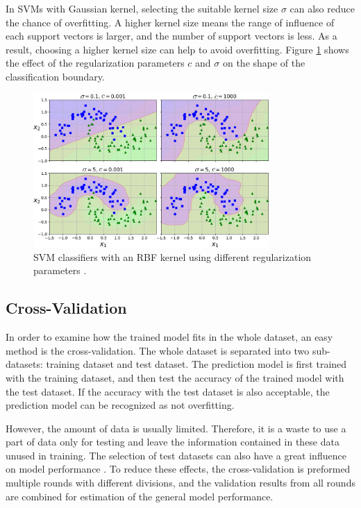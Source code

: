 In SVMs with Gaussian kernel, selecting the suitable kernel size $\sigma$ can also reduce the chance of overfitting. A higher kernel size means the range of influence of each support vectors is larger, and the number of support vectors is less. As a result, choosing a higher kernel size can help to avoid overfitting. Figure \ref{overfitting rbf} shows the effect of the regularization parameters $c$ and $\sigma$ on the shape of the classification boundary.

\begin{figure}[htb]
\centering
\includegraphics[width=0.8\textwidth]{figures/mls2_0509.png}
\caption{SVM classifiers with an RBF kernel using different regularization parameters \cite{geron2019hands}.}
\label{overfitting rbf}
\end{figure}

\subsection{Cross-Validation}


In order to examine how the trained model fits in the whole dataset, an easy method is the cross-validation. The whole dataset is separated into two sub-datasets: training dataset and test dataset. The prediction model is first trained with the training dataset, and then test the accuracy of the trained model with the test dataset. If the accuracy with the test dataset is also acceptable, the prediction model can be recognized as not overfitting.

However, the amount of data is usually limited. Therefore, it is a waste to use a part of data only for testing and leave the information contained in these data unused in training. The selection of test datasets can also have a great influence on model performance \cite{james2013introduction}. To reduce these effects, the cross-validation is preformed multiple rounds with different divisions, and the validation results from all rounds are combined for estimation of the general model performance.

